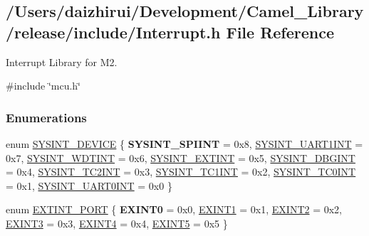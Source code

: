 \hypertarget{a00011}{}\subsection{/\+Users/daizhirui/\+Development/\+Camel\+\_\+\+Library/release/include/\+Interrupt.h File Reference}
\label{a00011}


Interrupt Library for M2.  


{\ttfamily \#include \char`\"{}mcu.\+h\char`\"{}}\newline
\subsubsection*{Enumerations}
\begin{DoxyCompactItemize}
\item 
enum \mbox{\hyperlink{a00011_afa38f6b3d96898de1e521bf88e097a4c}{S\+Y\+S\+I\+N\+T\+\_\+\+D\+E\+V\+I\+CE}} \{ {\bfseries S\+Y\+S\+I\+N\+T\+\_\+\+S\+P\+I\+I\+NT} = 0x8, 
\mbox{\hyperlink{a00011_afa38f6b3d96898de1e521bf88e097a4ca0363b01262967c7900f56bf11fb3541d}{S\+Y\+S\+I\+N\+T\+\_\+\+U\+A\+R\+T1\+I\+NT}} = 0x7, 
\mbox{\hyperlink{a00011_afa38f6b3d96898de1e521bf88e097a4caa245202adffe4900175deab41b6518fc}{S\+Y\+S\+I\+N\+T\+\_\+\+W\+D\+T\+I\+NT}} = 0x6, 
\mbox{\hyperlink{a00011_afa38f6b3d96898de1e521bf88e097a4caf7b71238d06781c61f2d4894f74b12c3}{S\+Y\+S\+I\+N\+T\+\_\+\+E\+X\+T\+I\+NT}} = 0x5, 
\mbox{\hyperlink{a00011_afa38f6b3d96898de1e521bf88e097a4ca108e51031e1626a71e03626005ee11c2}{S\+Y\+S\+I\+N\+T\+\_\+\+D\+B\+G\+I\+NT}} = 0x4, 
\mbox{\hyperlink{a00011_afa38f6b3d96898de1e521bf88e097a4cace28a954633dd9ea0cdef0ad00fe87a2}{S\+Y\+S\+I\+N\+T\+\_\+\+T\+C2\+I\+NT}} = 0x3, 
\mbox{\hyperlink{a00011_afa38f6b3d96898de1e521bf88e097a4ca6a6e9a3e70344b1de433dcde4bfa569d}{S\+Y\+S\+I\+N\+T\+\_\+\+T\+C1\+I\+NT}} = 0x2, 
\mbox{\hyperlink{a00011_afa38f6b3d96898de1e521bf88e097a4ca046fae26abf2ef23f7ea24607cd837f5}{S\+Y\+S\+I\+N\+T\+\_\+\+T\+C0\+I\+NT}} = 0x1, 
\mbox{\hyperlink{a00011_afa38f6b3d96898de1e521bf88e097a4ca3fce9e90d8963a30d0fdb51cd9009db9}{S\+Y\+S\+I\+N\+T\+\_\+\+U\+A\+R\+T0\+I\+NT}} = 0x0
 \}
\item 
enum \mbox{\hyperlink{a00011_af11f5754cc92430795a63bb53d964cd4}{E\+X\+T\+I\+N\+T\+\_\+\+P\+O\+RT}} \{ {\bfseries E\+X\+I\+N\+T0} = 0x0, 
\mbox{\hyperlink{a00011_af11f5754cc92430795a63bb53d964cd4a6c87103fd7c63fc99ee4b631c0a4dac4}{E\+X\+I\+N\+T1}} = 0x1, 
\mbox{\hyperlink{a00011_af11f5754cc92430795a63bb53d964cd4a92c5398067978d1aefd4ba3c276dec32}{E\+X\+I\+N\+T2}} = 0x2, 
\mbox{\hyperlink{a00011_af11f5754cc92430795a63bb53d964cd4a3c37ddaa34bf4297b421d8577be06895}{E\+X\+I\+N\+T3}} = 0x3, 
\mbox{\hyperlink{a00011_af11f5754cc92430795a63bb53d964cd4a766aca243fc0f7aa292c791202bef6e7}{E\+X\+I\+N\+T4}} = 0x4, 
\mbox{\hyperlink{a00011_af11f5754cc92430795a63bb53d964cd4af59c814bf9818345f24bb79e7533945c}{E\+X\+I\+N\+T5}} = 0x5
 \}
\end{DoxyCompactItemize}
